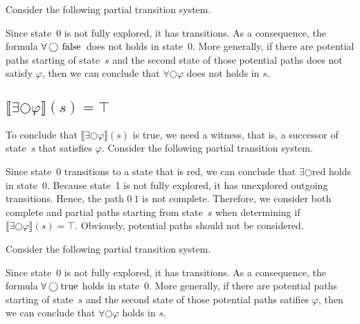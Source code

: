 \documentclass[12pt]{article}
\newcommand{\nxt}{\bigcirc}
\newcommand{\TRUE}{\mbox{\lstinline{true}}}
\newcommand{\FALSE}{\mbox{\lstinline{false}}}
\theoremstyle{definition}
\newcommand{\satisfaction}[1]{\llbracket #1 \rrbracket}
\newenvironment{franck}{\color{red}}{\color{black}}
\begin{document}
\begin{franck}
Consider the following partial transition system.
\begin{center}
\end{center}
Since state~0 is not fully explored, it has transitions.  As a consequence, the formula $\forall \nxt \FALSE$ does not holds in state~0.  More generally, if there are potential paths starting of state~$s$ and the second state of those potential paths does not satisfy $\varphi$, then we can conclude that $\forall \nxt \varphi$ does not holds in $s$.

\subsection*{$\satisfaction{\exists \nxt \varphi}(s) = \top$}

To conclude that $\satisfaction{\exists \nxt \varphi}(s)$ is true, we need a witness, that is, a successor of state~$s$ that satisfies $\varphi$.  Consider the following partial transition system.
\begin{center}
\end{center}
Since state~0 transitions to a state that is red, we can conclude that $\exists \nxt \mbox{red}$ holds in state~0.  Because state~1 is not fully explored, it has unexplored outgoing transitions.  Hence, the path $0\ 1$ is not complete.  Therefore, we consider both complete and partial paths starting from state~$s$ when determining if $\satisfaction{\exists \nxt \varphi}(s) = \top$.  Obviously, potential paths should not be considered.

Consider the following partial transition system.
\begin{center}
\end{center}
Since state~0 is not fully explored, it has transitions.  As a consequence, the formula $\forall \nxt \TRUE$ holds in state~0.  More generally, if there are potential paths starting of state~$s$ and the second state of those potential paths satifies $\varphi$, then we can conclude that $\forall \nxt \varphi$ holds in $s$.


\end{franck}
\end{document}
